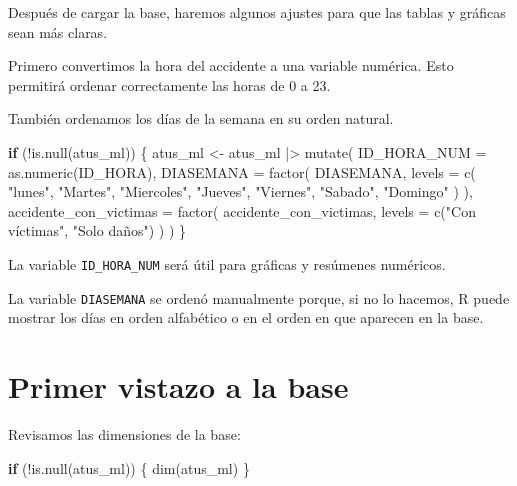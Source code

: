 \documentclass[
  11pt,
  letterpaper,
]{book}
\newenvironment{Shaded}{\begin{snugshade}}{\end{snugshade}}
\newcommand{\AttributeTok}[1]{\textcolor[rgb]{0.40,0.45,0.13}{#1}}
\newcommand{\ControlFlowTok}[1]{\textcolor[rgb]{0.00,0.23,0.31}{\textbf{#1}}}
\newcommand{\FunctionTok}[1]{\textcolor[rgb]{0.28,0.35,0.67}{#1}}
\newcommand{\NormalTok}[1]{\textcolor[rgb]{0.00,0.23,0.31}{#1}}
\newcommand{\OtherTok}[1]{\textcolor[rgb]{0.00,0.23,0.31}{#1}}
\newcommand{\SpecialCharTok}[1]{\textcolor[rgb]{0.37,0.37,0.37}{#1}}
\newcommand{\StringTok}[1]{\textcolor[rgb]{0.13,0.47,0.30}{#1}}
\begin{document}
Después de cargar la base, haremos algunos ajustes para que las tablas y
gráficas sean más claras.

Primero convertimos la hora del accidente a una variable numérica. Esto
permitirá ordenar correctamente las horas de 0 a 23.

También ordenamos los días de la semana en su orden natural.

\begin{Shaded}
\begin{Highlighting}[]
\ControlFlowTok{if}\NormalTok{ (}\SpecialCharTok{!}\FunctionTok{is.null}\NormalTok{(atus\_ml)) \{}
\NormalTok{  atus\_ml }\OtherTok{\textless{}{-}}\NormalTok{ atus\_ml }\SpecialCharTok{|\textgreater{}}
    \FunctionTok{mutate}\NormalTok{(}
      \AttributeTok{ID\_HORA\_NUM =} \FunctionTok{as.numeric}\NormalTok{(ID\_HORA),}
      \AttributeTok{DIASEMANA =} \FunctionTok{factor}\NormalTok{(}
\NormalTok{        DIASEMANA,}
        \AttributeTok{levels =} \FunctionTok{c}\NormalTok{(}
          \StringTok{"lunes"}\NormalTok{,}
          \StringTok{"Martes"}\NormalTok{,}
          \StringTok{"Miercoles"}\NormalTok{,}
          \StringTok{"Jueves"}\NormalTok{,}
          \StringTok{"Viernes"}\NormalTok{,}
          \StringTok{"Sabado"}\NormalTok{,}
          \StringTok{"Domingo"}
\NormalTok{        )}
\NormalTok{      ),}
      \AttributeTok{accidente\_con\_victimas =} \FunctionTok{factor}\NormalTok{(}
\NormalTok{        accidente\_con\_victimas,}
        \AttributeTok{levels =} \FunctionTok{c}\NormalTok{(}\StringTok{"Con víctimas"}\NormalTok{, }\StringTok{"Solo daños"}\NormalTok{)}
\NormalTok{      )}
\NormalTok{    )}
\NormalTok{\}}
\end{Highlighting}
\end{Shaded}

La variable \texttt{ID\_HORA\_NUM} será útil para gráficas y resúmenes
numéricos.

La variable \texttt{DIASEMANA} se ordenó manualmente porque, si no lo
hacemos, R puede mostrar los días en orden alfabético o en el orden en
que aparecen en la base.

\section{Primer vistazo a la base}\label{primer-vistazo-a-la-base}

Revisamos las dimensiones de la base:

\begin{Shaded}
\begin{Highlighting}[]
\ControlFlowTok{if}\NormalTok{ (}\SpecialCharTok{!}\FunctionTok{is.null}\NormalTok{(atus\_ml)) \{}
  \FunctionTok{dim}\NormalTok{(atus\_ml)}
\NormalTok{\}}
\end{Highlighting}
\end{Shaded}
\end{document}
